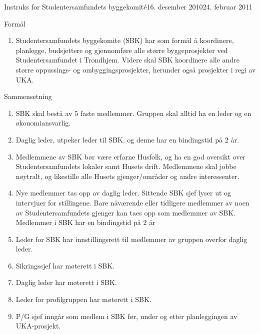\begin{instruks}{Instruks for Studentersamfundets byggekomité}{16. desember 2010}{24. februar 2011}

    \begin{instruksledd}{Formål}
        \begin{enumerate}
            \item Studentersamfundets byggekomite (SBK) har som formål å koordinere, planlegge,
                budsjettere og
                gjennomføre alle større byggeprosjekter ved Studentersamfundet i Trondhjem. Videre
                skal SBK koordinere
                alle andre større oppussings- og ombyggingsprosjekter, herunder også prosjekter i
                regi av UKA.
        \end{enumerate}
    \end{instruksledd}

    \begin{instruksledd}{Sammensetning}
        \begin{enumerate}
            \item SBK skal bestå av 5 faste medlemmer. Gruppen skal alltid ha en leder og en
                økonomiansvarlig.
            \item Daglig leder, utpeker leder til SBK, og denne har en bindingstid på 2 år.
            \item Medlemmene av SBK bør være erfarne Husfolk, og ha en god oversikt over
                Studentersamfundets lokaler
                samt Husets drift. Medlemmene skal jobbe nøytralt, og likestille alle Husets
                gjenger/områder og andre
                interessenter.
            \item Nye medlemmer tas opp av daglig leder. Sittende SBK sjef lyser ut og intervjuer
                for stillingene. Bare
                nåværende eller tidligere medlemmer av noen av Studentersamfundets gjenger kan
                taes opp som medlemmer
                av SBK. Medlemmer i SBK har en bindingstid på 2 år
            \item Leder for SBK har innstillingsrett til medlemmer av gruppen overfor daglig
                leder.
            \item Sikringssjef har møterett i SBK.
            \item Daglig leder har møterett i SBK.
            \item Leder for profilgruppen har møterett i SBK.
            \item P/G sjef inngår som medlem i SBK før, under og etter planleggingen av UKA-prosjekt.
        \end{enumerate}
    \end{instruksledd}


\end{instruks}
